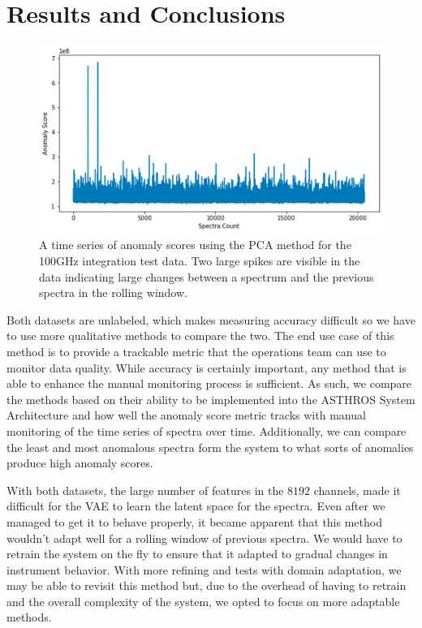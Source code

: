 \section{Results and Conclusions}
\label{spectra/sec:results}
\begin{figure}[b]
    \centering
    \includegraphics[width=0.5\linewidth]{figs/spectra/asthros_timeseries.png}
    \caption{A time series of anomaly scores using the PCA method for the 100GHz integration test data. Two large spikes are visible in the data indicating large changes between a spectrum and the previous spectra in the rolling window.}
    \label{spectra/fig:timeseries}
\end{figure}

Both datasets are unlabeled, which makes measuring accuracy difficult so we have to use more qualitative methods to compare the two.
The end use case of this method is to provide a trackable metric that the operations team can use to monitor data quality.
While accuracy is certainly important, any method that is able to enhance the manual monitoring process is sufficient. 
As such, we compare the methods based on their ability to be implemented into the ASTHROS System Architecture and how well the anomaly score metric tracks with manual monitoring of the time series of spectra over time. 
Additionally, we can compare the least and most anomalous spectra form the system to what sorts of anomalies produce high anomaly scores. 

With both datasets, the large number of features in the $8192$ channels, made it difficult for the VAE to learn the latent space for the spectra. 
Even after we managed to get it to behave properly, it became apparent that this method wouldn't adapt well for a rolling window of previous spectra. 
We would have to retrain the system on the fly to ensure that it adapted to gradual changes in instrument behavior.
With more refining and tests with domain adaptation, we may be able to revisit this method but, due to the overhead of having to retrain and the overall complexity of the system, we opted to focus on more adaptable methods. 


